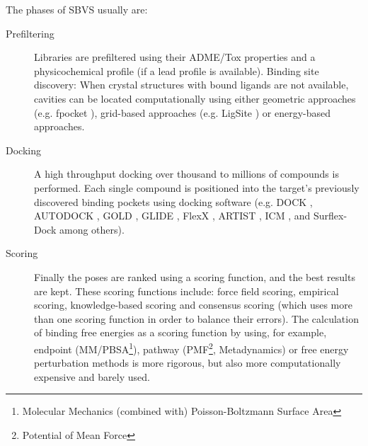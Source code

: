The phases of SBVS usually are:

\begin{description}

\item [Prefiltering] Libraries are prefiltered using their ADME/Tox properties and a physicochemical profile (if a lead profile is available).
Binding site discovery: When crystal structures with bound ligands are not available, cavities can be located computationally using either geometric approaches (e.g. fpocket \cite{le_guilloux_fpocket_2009}), grid-based approaches (e.g. LigSite \cite{huang_ligsitecsc_2006}) or energy-based approaches.

\item [Docking] A high throughput docking over thousand to millions \cite{tuffery_flexibility_2012} of compounds is performed. Each single compound is positioned into the target's previously discovered binding pockets using docking software (e.g. DOCK \cite{kuntz_geometric_1982}, AUTODOCK \cite{morris_distributed_1996, morris_autodock4_2009}, GOLD \cite{jones_molecular_1995}, GLIDE \cite{friesner_glide_2004}, FlexX \cite{rarey_fast_1996}, ARTIST \cite{yun_artist_2006}, ICM \cite{abagyan_icm_1994}, and Surflex-Dock \cite{jain_surflex_2003} among others).

\item[Scoring] Finally the poses are ranked using a scoring function, and the best results are kept. These scoring functions include: force field scoring, empirical scoring, knowledge-based scoring and consensus scoring (which uses more than one scoring function in order to balance their errors). The calculation of binding free energies as a scoring function by using, for example, endpoint (MM/PBSA\footnote{Molecular Mechanics (combined with) Poisson-Boltzmann Surface Area}), pathway (PMF\footnote{Potential of Mean Force}, Metadynamics) or free energy perturbation methods is more rigorous, but also more computationally expensive \cite{mobley_binding_2009, weis_ligand_2006} and barely used. 

\end {description}

